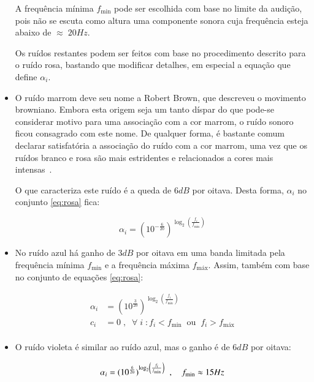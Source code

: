 \begin{itemize}
A frequência mínima $f_{\text{min}}$ pode ser escolhida com base no limite da audição, pois não se escuta como altura uma componente sonora cuja frequência esteja abaixo de $\approx\; 20Hz$.

Os ruídos restantes podem ser feitos com base no procedimento descrito para 
o ruído rosa, bastando que modificar detalhes, em especial a equação que define $\alpha_i$.

\item O ruído marrom deve seu nome a Robert Brown, que descreveu o movimento browniano.
Embora esta origem seja um tanto díspar do que pode-se considerar motivo para uma associação com a cor marrom, o ruído sonoro ficou consagrado com este nome. De qualquer forma, é bastante comum declarar satisfatória a associação do ruído com a cor marrom, uma vez que os ruídos branco e rosa são mais estridentes e relacionados a cores mais intensas~\cite{Cook,guillaume}.

O que caracteriza este ruído é a queda de $6dB$ por oitava. Desta forma, $\alpha_i$ 
no conjunto \ref{eq:rosa} fica:

\begin{equation}\label{eq:marrom}
\alpha_i=(10^{-\frac{6}{20}})^{\log _2 \left( \frac{f_i}{f_{\text{min}}} \right )}
\end{equation}

\item No ruído azul há ganho de $3dB$ por oitava em uma banda limitada
pela frequência mínima $f_{\text{min}}$ e a frequência
máxima $f_{\text{máx}}$. Assim, também com base no conjunto de equações \ref{eq:rosa}:

\begin{equation}\label{eq:azul}
\begin{split}
\alpha_i & = (10^{\frac{3}{20}})^{\log _2 \left ( \frac{f_i}{f_{\text{min}}} \right )} \\
c_i & =0\;,\;\; \forall \; i \; : f_i<f_{\text{min}} \;\; \text{ou} \;\; f_i>f_{\text{máx}} \\
\end{split}
\end{equation}

\item O ruído violeta é similar ao ruído azul, mas o ganho é de $6dB$ por oitava:

\begin{equation}\label{eq:violeta}
\alpha_i = (10^{\frac{6}{20}})^{\log _2 \left ( \frac{f_i}{f_{\text{min}}} \right )} \;\;, \quad f_{\text{min}} \approx 15 Hz \\
\end{equation}


\end{itemize}
